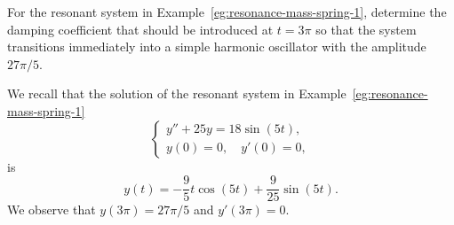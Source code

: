 

\begin{example}\label{eg:resonance-mass-spring-4}
	For the resonant system  in Example~\ref{eg:resonance-mass-spring-1}, determine the  damping coefficient that should be introduced at \(t = 3\pi \) so that the system transitions immediately into  a simple harmonic oscillator with the amplitude $27\pi/5.$ 
\end{example}
\begin{solution}
	We recall that the solution of the resonant system in Example~\ref{eg:resonance-mass-spring-1}
		\begin{equation}\label{eq:resonance-mass-spring-2}
	\begin{cases}
		y'' +25 y = 18 \sin(5 t),\\
	y(0) =0, \quad y'(0) = 0,
	\end{cases}
	\end{equation}
  is
		\[
	y(t) = -\frac{9}{5}t\cos(5t) + \frac{9}{25}\sin(5t). 
	\]
	We observe that  $y(3\pi) = {27\pi}/{5}$ and $y'(3\pi)=0.$
	

\end{solution}
